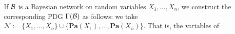 \documentclass{article}
\theoremstyle{plain}
\theoremstyle{definition}
\theoremstyle{remark}
\newcommand{\V}{\mathcal V}
\newcommand{\N}{\mathcal N}
\newcommand{\sfM}{\mathsf M}
\newcommand\Pa{\mathbf{Pa}}
\newcommand\PDGof{\Gamma}
\numberwithin{equation}{section}
\begin{document}
	\begin{defn}\label{def:bn2PDG}
		If $\cal B$ is a Bayesian network on random variables
    $X_1, \ldots, X_n$, we construct the corresponding PDG
	$\PDGof(\cal B)$
				as follows: we take $\N := \{X_1, \ldots, X_n \} \cup
				\{ \Pa(X_1), \ldots, \Pa(X_n)\}$.  
That is, the variables of 

\end{defn}
\end{document}
